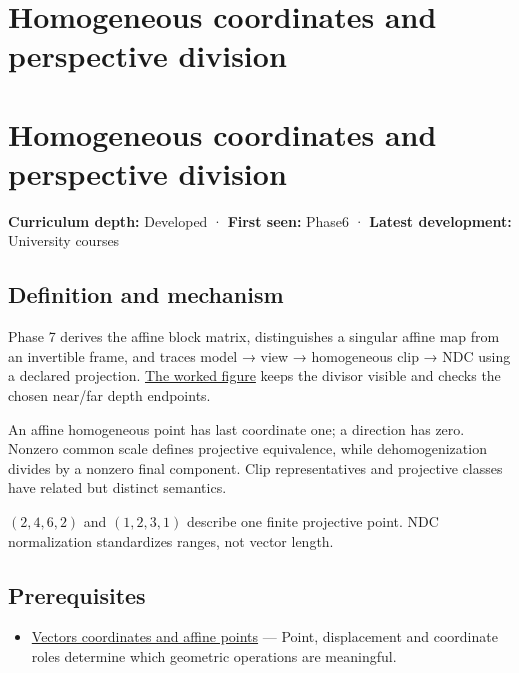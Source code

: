 \hypertarget{appendix-cb3b26862282}{}
\section*{Homogeneous coordinates and perspective division}
\section{Homogeneous coordinates and perspective division}\label{homogeneous-coordinates-and-perspective-division}

\textbf{Curriculum depth:} Developed · \textbf{First seen:} Phase6 · \textbf{Latest development:} University courses

\subsection{Definition and mechanism}\label{definition-and-mechanism}

Phase 7 derives the affine block matrix, distinguishes a singular affine map from an invertible frame, and traces model → view → homogeneous clip → NDC using a declared projection. \href{Continuous\%20Notes/Computing\%20Foundations\%20-\%20From\%20Bits\%20to\%20C++\%20and\%20Systems\%20APIs\#Figure\%20M6\%20-\%20Follow\%20one\%20point\%20through\%20named\%20spaces}{The worked figure} keeps the divisor visible and checks the chosen near/far depth endpoints.

An affine homogeneous point has last coordinate one; a direction has zero. Nonzero common scale defines projective equivalence, while dehomogenization divides by a nonzero final component. Clip representatives and projective classes have related but distinct semantics.

\((2,4,6,2)\) and \((1,2,3,1)\) describe one finite projective point. NDC normalization standardizes ranges, not vector length.

\subsection{Prerequisites}\label{prerequisites}

\begin{itemize}
\tightlist
\item
  \hyperref[appendix-0659864c0aa3]{Vectors coordinates and affine points} --- Point, displacement and coordinate roles determine which geometric operations are meaningful.
\end{itemize}

